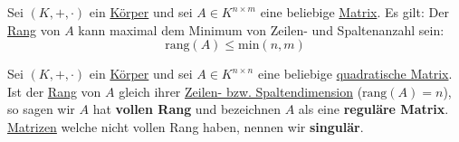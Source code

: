 \documentclass[../../main.tex]{subfiles}
\begin{document}
	\begin{theorem}
		Sei $(K,+,\cdot)$ ein \hyperref[def:Körper]{Körper} und sei $A\in K^{n \times m}$ eine beliebige \hyperref[def:Matrix]{Matrix}. Es gilt: Der \hyperref[def:RangMatrix]{Rang} von $A$ kann maximal dem Minimum von Zeilen- und Spaltenanzahl sein: $$\textrm{rang}(A) \leq \textrm{min}(n,m)$$
	\end{theorem}

	\begin{definition}
		\label{def:reguläreMatrix}
		\label{def:singuläreMatrix}
		\label{def:vollerRang}
		Sei $(K,+,\cdot)$ ein \hyperref[def:Körper]{Körper} und sei $A\in K^{n \times n}$ eine beliebige \hyperref[def:QuadratischeMatrix]{quadratische Matrix}. Ist der \hyperref[def:RangMatrix]{Rang} von $A$ gleich ihrer \hyperref[def:DimensionMatrix]{Zeilen- bzw. Spaltendimension} ($\textrm{rang}(A)=n$), so sagen wir $A$ hat \textbf{vollen Rang} und bezeichnen $A$ als eine \textbf{reguläre Matrix}. \hyperref[def:Matrix]{Matrizen} welche nicht vollen Rang haben, nennen wir \textbf{singulär}. 
	\end{definition}
	
\end{document}
